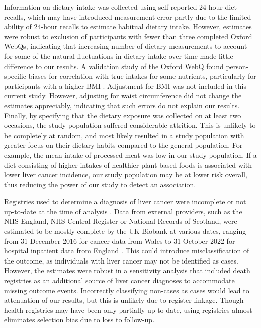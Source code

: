 \documentclass[nutrients,article,submit,moreauthors,pdftex]{Definitions/mdpi}
\begin{document}
Information on dietary intake was collected using self-reported 24-hour
diet recalls, which may have introduced measurement error partly due to
the limited ability of 24-hour recalls to estimate habitual dietary
intake. However, estimates were robust to exclusion of participants with
fewer than three completed Oxford WebQs, indicating that increasing
number of dietary measurements to account for some of the natural
fluctuations in dietary intake over time made little difference to our
results. A validation study of the Oxford WebQ found person-specific
biases for correlation with true intakes for some nutrients,
particularly for participants with a higher BMI \citep{Greenwood2019}.
Adjustment for BMI was not included in this current study. However,
adjusting for waist circumference did not change the estimates
appreciably, indicating that such errors do not explain our results.
Finally, by specifying that the dietary exposure was collected on at
least two occasions, the study population suffered considerable
attrition. This is unlikely to be completely at random, and most likely
resulted in a study population with greater focus on their dietary
habits compared to the general population. For example, the mean intake
of processed meat was low in our study population. If a diet consisting
of higher intakes of healthier plant-based foods is associated with
lower liver cancer incidence, our study population may be at lower risk
overall, thus reducing the power of our study to detect an association.

Registries used to determine a diagnosis of liver cancer were incomplete
or not up-to-date at the time of analysis \citep{RN112}. Data from external
providers, such as the NHS England, NHS Central Register or National
Records of Scotland, were estimated to be mostly complete by the UK
Biobank at various dates, ranging from 31 December 2016 for cancer data
from Wales to 31 October 2022 for hospital inpatient data from England
\citep{RN114}. This could introduce misclassification of the outcome, as
individuals with liver cancer may not be identified as cases. However,
the estimates were robust in a sensitivity analysis that included death
registries as an additional source of liver cancer diagnoses to
accommodate missing outcome events. Incorrectly classifying non-cases as
cases would lead to attenuation of our results, but this is unlikely due
to register linkage. Though health registries may have been only
partially up to date, using registries almost eliminates selection bias
due to loss to follow-up.
\end{document}
